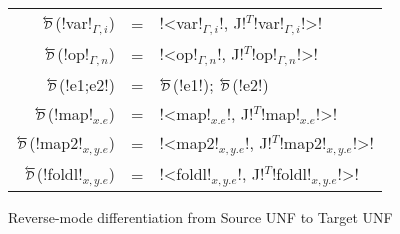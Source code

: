 \begin{figure*}[t]
    \begin{tabular}{r c l}
    $\Dsynrevsymbol$(!var!$_{\Gamma,i}$) &=& !<var!$_{\Gamma,i}$!, J!$^T$!var!$_{\Gamma,i}$!>! \\
    $\Dsynrevsymbol$(!op!$_{\Gamma,n}$) &=& !<op!$_{\Gamma,n}$!, J!$^T$!op!$_{\Gamma,n}$!>! \\ 
    $\Dsynrevsymbol$(!e1;e2!) &=& $\Dsynrevsymbol$(!e1!); $\Dsynrevsymbol$(!e2!)\\ 
    $\Dsynrevsymbol$(!map!$_{x.e}$) &=& !<map!$_{x.e}$!, J!$^T$!map!$_{x.e}$!>! \\ 
    $\Dsynrevsymbol$(!map2!$_{x,y.e}$) &=& !<map2!$_{x,y.e}$!, J!$^T$!map2!$_{x,y.e}$!>! \\ 
    $\Dsynrevsymbol$(!foldl!$_{x,y.e}$) &=& !<foldl!$_{x,y.e}$!, J!$^T$!foldl!$_{x,y.e}$!>! \\  
    \end{tabular}
    \caption{Reverse-mode differentiation from Source UNF to Target UNF}
    \label{fig:diff_macro}    \end{figure*}
